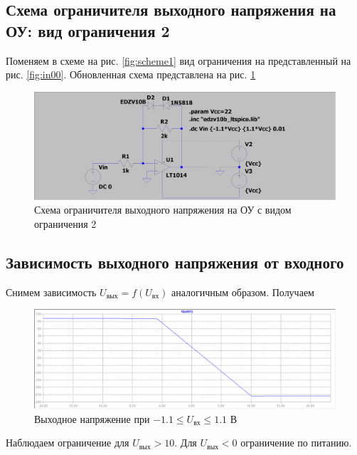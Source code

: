 \documentclass[a4paper, 12pt]{article}
\begin{document}
    \subsection{Схема ограничителя выходного напряжения на ОУ: вид ограничения 2}
    Поменяем в схеме на рис. \ref{fig:scheme1} вид ограничения на представленный на рис. \ref{fig:in00}.
    Обновленная схема представлена на рис. \ref{fig:scheme3}
    \begin{figure}[H]
        \centering
        \includegraphics[scale=0.22]{scheme3.png}
        \captionsetup{skip=0pt}
        \caption{Схема ограничителя выходного напряжения на ОУ с видом ограничения 2}
        \label{fig:scheme3}
    \end{figure}


    \subsection{Зависимость выходного напряжения от входного}
    Снимем зависимость $U_\text{вых}=f\left( U_\text{вх} \right)$ аналогичным образом.
    Получаем
    \begin{figure}[H]
        \centering
        \includegraphics[scale=0.46]{1task2_fuin.png}
        \captionsetup{skip=0pt}
        \caption{Выходное напряжение при $-1.1\leq U_\text{вх}\leq 1.1$ В}
        \label{fig:1task2_fuin}
    \end{figure}
    Наблюдаем ограничение для $U_\text{вых}>10$. Для $U_\text{вых}<0$ ограничение по питанию.
\end{document}

